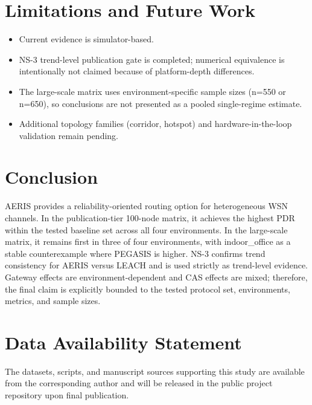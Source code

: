 \documentclass[sensors,article,submit,moreauthors,pdftex]{Definitions/mdpi}
\begin{document}
\section{Limitations and Future Work}
\begin{itemize}
\item Current evidence is simulator-based.
\item NS-3 trend-level publication gate is completed; numerical equivalence is intentionally not claimed because of platform-depth differences.
\item The large-scale matrix uses environment-specific sample sizes (n=550 or n=650), so conclusions are not presented as a pooled single-regime estimate.
\item Additional topology families (corridor, hotspot) and hardware-in-the-loop validation remain pending.
\end{itemize}

\section{Conclusion}
AERIS provides a reliability-oriented routing option for heterogeneous WSN channels. In the publication-tier 100-node matrix, it achieves the highest PDR within the tested baseline set across all four environments. In the large-scale matrix, it remains first in three of four environments, with indoor\_office as a stable counterexample where PEGASIS is higher. NS-3 confirms trend consistency for AERIS versus LEACH and is used strictly as trend-level evidence. Gateway effects are environment-dependent and CAS effects are mixed; therefore, the final claim is explicitly bounded to the tested protocol set, environments, metrics, and sample sizes.

\section*{Data Availability Statement}
The datasets, scripts, and manuscript sources supporting this study are available from the corresponding author and will be released in the public project repository upon final publication.


\end{document}
